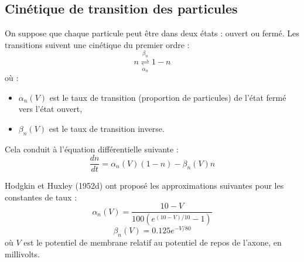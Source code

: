 \documentclass[10pt,french]{beamer}
\begin{document}
	\subsection{Cinétique de transition des particules}
	\begin{frame}
		On suppose que chaque particule peut être dans deux états : ouvert ou fermé. Les transitions suivent une cinétique du premier ordre :
		\begin{equation}
			n \underset{\alpha_n}{\overset{\beta_n}{\rightleftharpoons}} 1 - n
			\label{eq:2}
		\end{equation}
		où :
		\begin{itemize}
			\item $\alpha_n(V)$ est le taux de transition (proportion de particules) de l’état fermé vers l’état ouvert,
			\item $\beta_n(V)$ est le taux de transition inverse.
		\end{itemize}
		Cela conduit à l’équation différentielle suivante :
		\begin{equation}
			\frac{dn}{dt} = \alpha_n(V)(1 - n) - \beta_n(V) n
			\label{eq:3}
		\end{equation}
	\end{frame}
	
	\begin{frame}
		Hodgkin et Huxley (1952d) ont proposé les approximations suivantes pour les constantes de taux :
		\begin{equation}
			\alpha_n(V) = \frac{10 - V}{100(e^{(10 - V)/10} - 1)}     \label{eq:4}
		\end{equation}
		\begin{equation}
			\beta_n(V) = 0.125e^{-V/80}     \label{eq:5}
		\end{equation}
		où $V$ est le potentiel de membrane relatif au potentiel de repos de l’axone, en millivolts.
	\end{frame}
	
\end{document}
